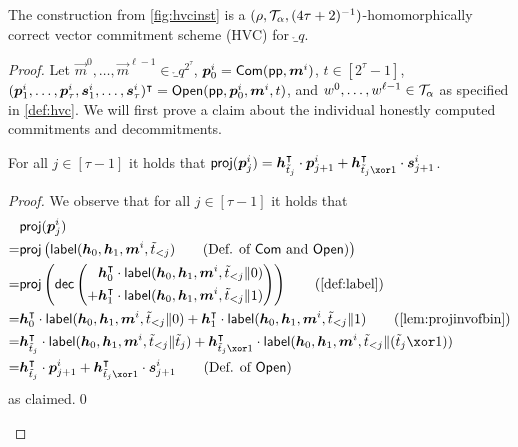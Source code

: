 \begin{lemma}\label{lem:veccomcorrectness}
  The construction from \autoref{fig:hvcinst} is a $(\rho,\mathcal{T}_\alpha,(4\tau+2)^{-1})$-homomorphically correct vector commitment scheme (HVC) for $\ring_q$.
\end{lemma}
\begin{proof}
Let $\vec{m}^0,\dots,\vec{m}^{\ell-1}\in\ring_q^{2^\tau}$, $\boldsymbol{p}_0^i = \mathsf{Com}(\mathsf{pp},\boldsymbol{m}^i)$, $t\in[2^\tau-1]$, $(\boldsymbol{p}^i_1,\dots,\boldsymbol{p}^i_{\tau},\boldsymbol{s}^i_1, \dots, \boldsymbol{s}^i_{\tau})^\intercal = \mathsf{Open}(\mathsf{pp},\boldsymbol{p}_0^i,\boldsymbol{m}^i,t)$, and $w^0,\dots,w^{\ell-1}\in\mathcal{T}_\alpha$
as specified in \autoref{def:hvc}.
We will first prove a claim about the individual honestly computed commitments and decommitments.

\begin{claim}\label{claim:honestcheck}
  For all $j\in[\tau-1]$ it holds that $\proj(\vec{p}^i_j) = \vec{h}_{\tilde t_j}^\intercal\cdot \vec{p}^i_{j+1} + \vec{h}_{\tilde t_j\xor 1}^\intercal \cdot \vec{s}^i_{j+1}$.
\end{claim}
\begin{proof}
We observe that for all $j\in[\tau-1]$ it holds that
\begin{align*}
  &\proj(\vec{p}^i_j)\\
  =&\proj\left(\lbl(\vec{h}_0,\vec{h}_1,\vec{m}^i,\tilde t_{< j})\tag{Def. of $\commit$ and $\open$}\right)\\
  =&\proj\left(\decomp\left(\begin{aligned}
  &\vec{h}_0^\intercal \cdot\lbl(\vec{h}_0,\vec{h}_1,\vec{m}^i,\tilde t_{< j}\Vert 0)\\ +& \vec{h}_1^\intercal \cdot\lbl(\vec{h}_0,\vec{h}_1,\vec{m}^i,\tilde t_{< j}\Vert 1)
  \end{aligned}\right)\right)\tag{\autoref{def:label}}\\
  =&\vec{h}_0^\intercal \cdot\lbl(\vec{h}_0,\vec{h}_1,\vec{m}^i,\tilde t_{< j}\Vert 0) + \vec{h}_1^\intercal \cdot\lbl(\vec{h}_0,\vec{h}_1,\vec{m}^i,\tilde t_{< j}\Vert 1)\tag{\autoref{lem:projinvofbin}}\\
  =&\vec{h}_{\tilde t_{j}}^\intercal \cdot\lbl(\vec{h}_0,\vec{h}_1,\vec{m}^i,\tilde t_{< j}\Vert \tilde t_{j}) + \vec{h}_{\tilde t_{j}\xor 1}^\intercal \cdot\lbl(\vec{h}_0,\vec{h}_1,\vec{m}^i,\tilde t_{< j}\Vert (\tilde t_{j}\xor 1))\\
  =&\vec{h}_{\tilde t_{j}}^\intercal \cdot\vec{p}^i_{j+1} + \vec{h}_{\tilde t_{j}\xor 1}^\intercal \cdot\vec{s}^i_{j+1}\tag{Def. of $\open$}
\end{align*} as claimed.\qed
\end{proof}
\end{proof}
